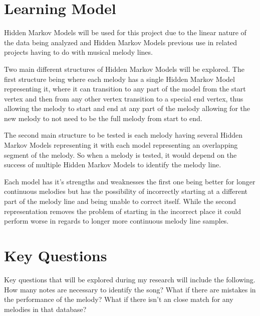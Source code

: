 \documentclass{article}
\begin{document}
	\section{Learning Model}
	Hidden Markov Models will be used for this project due to the linear nature of the data being 
	analyzed and Hidden Markov Models previous use in related projects having to do with musical melody lines. 
	
	Two main different structures of Hidden Markov Models will be explored. The first structure being 
	where each melody has a single Hidden Markov Model representing it, where it can transition to any
	part of the model from the start vertex and then from any other vertex transition to a special end 
	vertex, thus allowing the melody to start and end at any part of the melody allowing for the new melody 
	to not need to be the full melody from start to end.
	
	The second main structure to be tested is each melody having several Hidden Markov Models representing 
	it with each model representing an overlapping segment of the melody. So when a melody is tested, it would depend on 
	the success of multiple Hidden Markov Models to identify the melody line.
	
	Each model has it's strengths and weaknesses the first one being better for longer continuous melodies but has the 
	possibility of incorrectly starting at a different part of the melody line and being unable to correct itself.
	While the second representation removes the problem of starting in the incorrect place it could perform worse in regards
	to longer more continuous melody line samples.
		
	\section{Key Questions}
	Key questions that will be explored during my research will include the following. How many notes are necessary 
	to identify the song? What if there are mistakes in the performance of the melody? What if there isn't an close 
	match for any melodies in that database? 
	
\end{document}
